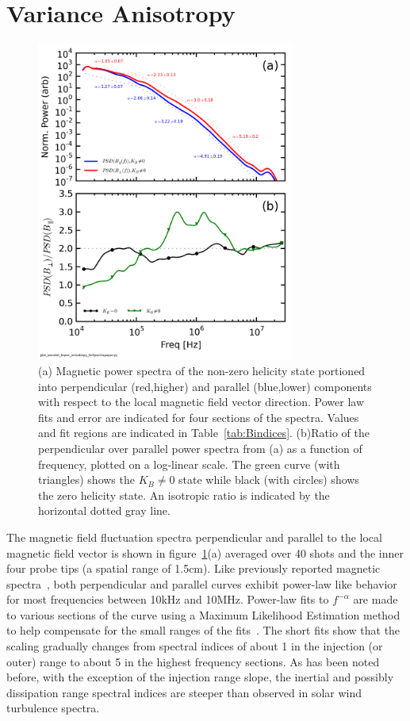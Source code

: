 \documentclass[aip,prl,amsmath,amssymb,reprint,superscriptaddress]{revtex4-1} %
\begin{document}
\section{Variance Anisotropy}\label{sec:variance}

\begin{figure}[!htbp]
\centerline{
\includegraphics[width=8.5cm]{Bperppara_chan1t4_1mWbspectra_40t60us_wAsymRatio}}
\caption{\label{fig:spectra} (a) Magnetic power spectra of the non-zero helicity state portioned into perpendicular (red,higher) and parallel (blue,lower) components with respect to the local magnetic field vector direction. Power law fits and error are indicated for four sections of the spectra. Values and fit regions are indicated in Table~\ref{tab:Bindices}. (b)Ratio of the perpendicular over parallel power spectra from (a) as a function of frequency, plotted on a log-linear scale. The green curve (with triangles) shows the $K_{B}\neq 0$ state while black (with circles) shows the zero helicity state. An isotropic ratio is indicated by the horizontal dotted gray line.}
\end{figure}

The magnetic field fluctuation spectra perpendicular and parallel to the local magnetic field vector is shown in figure~\ref{fig:spectra}(a) averaged over 40 shots and the inner four probe tips (a spatial range of 1.5cm). Like previously reported magnetic spectra~\cite{schaffner14a}, both perpendicular and parallel curves exhibit power-law like behavior for most frequencies between 10kHz and 10MHz. Power-law fits to $f^{-\alpha}$ are made to various sections of the curve using a Maximum Likelihood Estimation method~\cite{clauset09} to help compensate for the small ranges of the fits~\cite{deWit13}. The short fits show that the scaling gradually changes from spectral indices of about 1 in the injection (or outer) range to about 5 in the highest frequency sections. As has been noted before, with the exception of the injection range slope, the inertial and possibly dissipation range spectral indices are steeper than observed in solar wind turbulence spectra.
\end{document}
